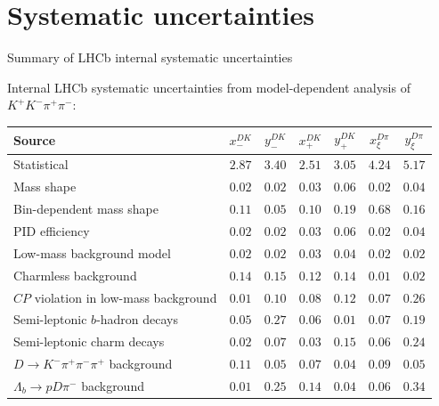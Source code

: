\documentclass{beamer}
\begin{document}
\section{Systematic uncertainties}
\begin{frame}{Summary of LHCb internal systematic uncertainties}
  \begin{center}
    Internal LHCb systematic uncertainties from model-dependent analysis of $K^+K^-\pi^+\pi^-$:
  \end{center}
  \vspace{-0.3cm}
  \scriptsize
  \vspace{0.02cm}
  \begin{center}
    \begin{tabular}{lcccccc}
        \hline
        Source & $x_-^{DK}$ & $y_-^{DK}$ & $x_+^{DK}$ & $y_+^{DK}$ & $x_\xi^{D\pi}$ & $y_\xi^{D\pi}$ \\
        \hline
        Statistical                                                & $2.87$ & $3.40$ & $2.51$ & $3.05$ & $4.24$ & $5.17$ \\
        \hline
        Mass shape                                                 & $0.02$ & $0.02$ & $0.03$ & $0.06$ & $0.02$ & $0.04$ \\
        Bin-dependent mass shape                                   & $0.11$ & $0.05$ & $0.10$ & $0.19$ & $0.68$ & $0.16$ \\
        PID efficiency                                             & $0.02$ & $0.02$ & $0.03$ & $0.06$ & $0.02$ & $0.04$ \\
        Low-mass background model                                  & $0.02$ & $0.02$ & $0.03$ & $0.04$ & $0.02$ & $0.02$ \\
        Charmless background                                       & $0.14$ & $0.15$ & $0.12$ & $0.14$ & $0.01$ & $0.02$ \\
        $C\!P$ violation in low-mass background                    & $0.01$ & $0.10$ & $0.08$ & $0.12$ & $0.07$ & $0.26$ \\
        Semi-leptonic $b$-hadron decays                            & $0.05$ & $0.27$ & $0.06$ & $0.01$ & $0.07$ & $0.19$ \\
        Semi-leptonic charm decays                                 & $0.02$ & $0.07$ & $0.03$ & $0.15$ & $0.06$ & $0.24$ \\
        $D\to K^-\pi^+\pi^-\pi^+$ background                       & $0.11$ & $0.05$ & $0.07$ & $0.04$ & $0.09$ & $0.05$ \\
        $\Lambda_b\to pD\pi^-$ background                          & $0.01$ & $0.25$ & $0.14$ & $0.04$ & $0.06$ & $0.34$ \\

\end{tabular}
\end{center}
\end{frame}
\end{document}
